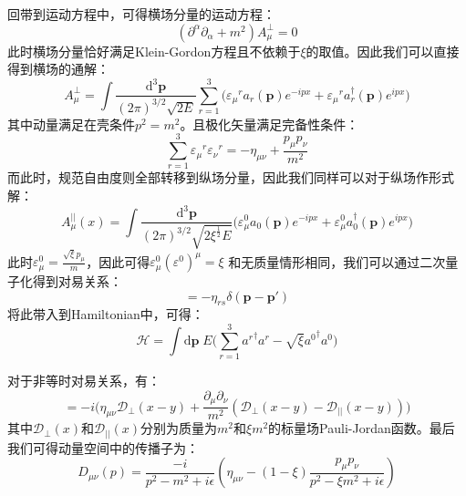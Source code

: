 回带到运动方程中，可得横场分量的运动方程：
\begin{equation}
(\partial^\alpha\partial_\alpha+m^2)A^\bot_\mu=0
\end{equation}
此时横场分量恰好满足Klein-Gordon方程且不依赖于$\xi$的取值。因此我们可以直接得到横场的通解：
\begin{equation}
A^\bot_\mu=\int\frac{\mathrm{d}^3\boldsymbol{p}}{(2\pi)^{3/2}\sqrt{2E}}\sum_{r=1}^{3}\Big({\varepsilon_\mu}^r a_r(\boldsymbol{p})e^{-ipx}+{\varepsilon_\mu}^r a^\dagger_r(\boldsymbol{p})e^{ipx}\Big)
\end{equation}
其中动量满足在壳条件${p}^2=m^2$。且极化矢量满足完备性条件：
\begin{equation}
\sum_{r=1}^{3}{\varepsilon_\mu}^r{\varepsilon_\nu}^r=-\eta_{\mu\nu}+\frac{p_\mu p_\nu}{m^2}
\end{equation}
而此时，规范自由度则全部转移到纵场分量，因此我们同样可以对于纵场作形式解：
\begin{equation}
A^{||}_\mu(x)=\int\frac{\mathrm{d}^3\boldsymbol{p}}{(2\pi)^{3/2}\sqrt{2{\xi}^{\frac{1}{2}}E}}\Big(\varepsilon^0_\mu a_0(\boldsymbol{p})e^{-ipx}+\varepsilon^0_\mu a_0^\dagger(\boldsymbol{p})e^{ipx}	\Big)
\end{equation}
此时$\varepsilon^0_\mu=\frac{\sqrt{\xi}p_\mu}{m}$，因此可得$\varepsilon^0_\mu(\varepsilon^0)^\mu=\xi$
和无质量情形相同，我们可以通过二次量子化得到对易关系：
\begin{equation}
[a_r(t,\boldsymbol{p}),a_s^\dagger(t,\boldsymbol{p}')]=-\eta_{rs}\delta(\boldsymbol{p}-\boldsymbol{p}')
\end{equation}
将此带入到Hamiltonian中，可得：
\begin{equation}
\mathcal{H}=\int\mathrm{d}\boldsymbol{p}\;E\Big( \sum_{r=1}^{3}{a^r}^\dagger a^r-\sqrt{\xi}{a^0}^\dagger a^0 \Big)
\end{equation}

对于非等时对易关系，有：
\begin{equation}
[A_\mu(x),A_\nu(y)]=-i\Big(\eta_{\mu\nu}\mathscr{D}_{\bot}(x-y)+\frac{\partial_\mu\partial_\nu}{m^2}(\mathscr{D}_\bot(x-y)-\mathscr{D}_{||}(x-y))\Big)
\end{equation}
其中$\mathscr{D}_{\bot}(x)$和$\mathscr{D}_{||}(x)$分别为质量为$m^2$和$\xi m^2$的标量场Pauli-Jordan函数。最后我们可得动量空间中的传播子为：
\begin{equation}
D_{\mu\nu}(p)=\frac{-i}{p^2-m^2+i\epsilon}\left(\eta_{\mu\nu}-(1-\xi)\frac{p_\mu p_\nu}{p^2-\xi m^2+i\epsilon}\right)
\end{equation}

